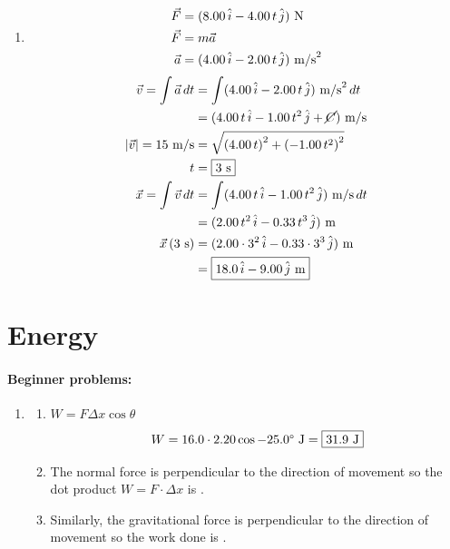 \documentclass[12pt,letterpaper]{article}
\begin{document}
\begin{multicols}{2}
\begin{enumerate}
\item \[
\begin{aligned}
\vec{F} &= (8.00\,\hat{i}-4.00\,t\,\hat{j})\ \text{N}\\
\vec{F} &= m\vec{a}\\
\vec{a} &= (4.00\,\hat{i}-2.00\,t\,\hat{j})\ \text{m\slash s}^2
\end{aligned}
\] \[
\begin{aligned}
\vec{v} = \int \vec{a}\,dt &= \int (4.00\,\hat{i}-2.00\,t\,\hat{j})\ \text{m\slash s}^2\,dt\\
                           &= (4.00\,t\,\hat{i}-1.00\,t^2\,\hat{j}+\cancel{C})\ \text{m\slash s}\\
|\vec{v}| = 15\ \text{m\slash s} &= \sqrt{\left(4.00\,t\right)^2+\left(-1.00\,t^2\right)^2}\\
t &= \fbox{3 s}\\
\vec{x} = \int \vec{v}\,dt &= \int (4.00\,t\,\hat{i}-1.00\,t^2\,\hat{j})\ \text{m\slash s}\, dt\\
                            &= (2.00\,t^2\,\hat{i}-0.33\,t^3\,\hat{j})\ \text{m}\\
\vec{x}\,(3\ \text{s}) &= (2.00\cdot 3^2\,\hat{i}-0.33\cdot 3^3\,\hat{j})\ \text{m}\\
&= \fbox{$18.0\,\hat{i}-9.00\,\hat{j}$ m}
\end{aligned}
\]
\end{enumerate}

\section{Energy}

\paragraph{Beginner problems:}
\begin{enumerate}
\item
\begin{enumerate}[label=(\alph*)]
\item
$\displaystyle W = F \Delta x \cos \theta$
$$W = 16.0 \cdot 2.20 \cos -25.0\degree\ \text{J} = \fbox{31.9 J}$$

\item The normal force is perpendicular to the direction of movement so the dot product $W = F \cdot \Delta x$ is .

\item Similarly, the gravitational force is perpendicular to the direction of movement so the work done is .


\end{enumerate}
\end{enumerate}
\end{multicols}
\end{document}
